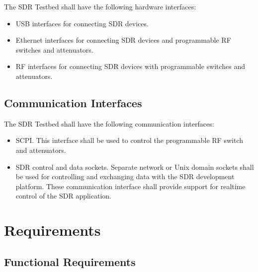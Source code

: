 \documentclass[english,titlepage,a4paper]{report}
\begin{document}
The SDR Testbed shall have the following hardware interfaces:
\begin{itemize}
\item USB interfaces for connecting SDR devices.
\item Ethernet interfaces for connecting SDR devices and programmable RF switches and attenuators.
\item RF interfaces for connecting SDR devices with programmable switches and attenuators.
\end{itemize}

\section{Communication Interfaces}

The SDR Testbed shall have the following communication interfaces:
\begin{itemize}
\item SCPI.
  This interface shall be used to control the programmable RF switch and attenuators.
\item SDR control and data sockets.
  Separate network or Unix domain sockets shall be used for controlling and exchanging data with the SDR development platform.
  These communication interface shall provide support for realtime control of the SDR application.
\end{itemize}

\chapter{Requirements} \label{chapter_4}
\section{Functional Requirements}
\end{document}
